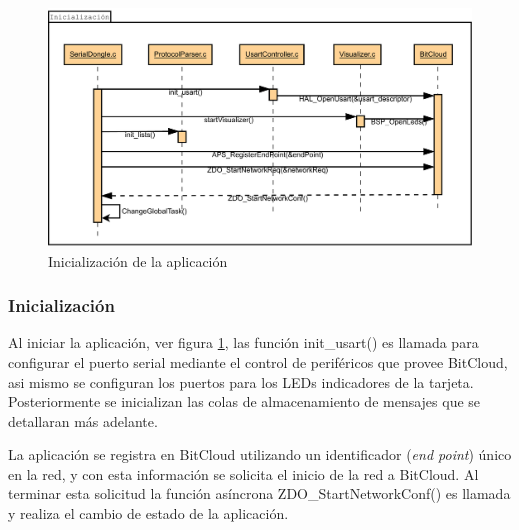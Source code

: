 \begin{figure}
	\centering
	\includegraphics[scale=0.35]{capitulo_3_imgs/Inicializacion.pdf}
	\caption{Inicialización de la aplicación}
	\label{fig:diagrama_inicializacion}
\end{figure}

\subsubsection{Inicialización}

Al iniciar la aplicación, ver figura \ref{fig:diagrama_inicializacion}, las función init\_usart() es llamada para configurar el puerto serial mediante el control de periféricos que provee BitCloud, asi mismo se configuran los puertos para los LEDs indicadores de la tarjeta. Posteriormente se inicializan las colas de almacenamiento de mensajes que se detallaran más adelante. 

La aplicación se registra en BitCloud utilizando un identificador (\textit{end point}) único en la red, y con esta información se solicita el inicio de la red a BitCloud. Al terminar esta solicitud la función asíncrona ZDO\_StartNetworkConf() es llamada y realiza el cambio de estado de la aplicación. 


